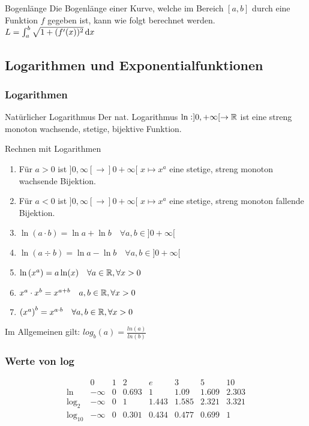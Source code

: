 \begin{theorem}{Bogenlänge}
	Die Bogenlänge einer Kurve, welche im Bereich $[a,b]$ durch eine Funktion $f$ gegeben ist, kann wie folgt berechnet werden.
	\\$L = \int_{a}^{b} \sqrt{1 + ( f'(x) )^2} \dif x$
\end{theorem}

\subsection{Logarithmen und Exponentialfunktionen}

\subsubsection{Logarithmen}
\begin{corollary}{Natürlicher Logarithmus}
   Der nat. Logarithmus $\ln:]0, + \infty[ \to \mathbb{R}$ ist eine streng monoton wachsende, stetige, bijektive Funktion.
\end{corollary}

\begin{corollary}{Rechnen mit Logarithmen}
    \begin{enumerate}
        \item Für $a > 0$ ist $]0, \infty[ \to ]0 + \infty[$ \quad $x \mapsto x^a$ eine stetige, streng monoton wachsende Bijektion.
        \item Für $a < 0$ ist $]0, \infty[ \to ]0 + \infty[$ \quad $x \mapsto x^a$ eine stetige, streng monoton fallende Bijektion.
        \item $\ln (a \cdot b) = \ln a + \ln b \quad \forall a,b \in ]0 +  \infty[$
        \item $\ln (a \div b) = \ln a - \ln b \quad \forall a,b \in ]0 +  \infty[$
        \item ${\ln \left(x^a\right) = a \ln (x) \quad \forall a \in \mathbb{R}, \forall x > 0}$
        \item ${x^a \cdot x^b = x^{a+b} \quad a,b \in \mathbb{R}, \forall x > 0}$
        \item ${\left(x^a\right)^b = x^{a \cdot b} \quad \forall a,b \in \mathbb{R}, \forall x > 0}$
    \end{enumerate}
    Im Allgemeinen gilt: $log_b (a) = \frac{ln(a)}{ln(b)}$
\end{corollary}


\subsubsection{Werte von log}
\begin{equation*}
	\begin{array}{lccccccc}
		& 0 & 1 & 2 & e & 3 & 5 & 10\\
		\ln & - \infty & 0 & 0.693 & 1 & 1.09 & 1.609 & 2.303\\
		\log_2 & - \infty & 0 & 1 & 1.443 & 1.585 & 2.321 & 3.321\\
		\log_{10} & - \infty & 0 & 0.301 & 0.434 & 0.477 & 0.699 & 1
	\end{array}
\end{equation*}

